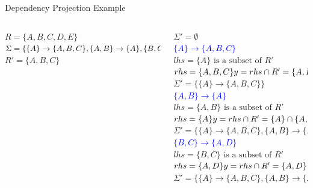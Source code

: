 \documentclass[UTF8]{beamer}
\begin{document}
\begin{frame}[fragile]{Dependency Projection Example}
\scriptsize
\begin{columns}
    \begin{column}{0.3\textwidth}
        $R = \{A,B,C,D,E\}$\\
\vspace{0.2cm}
$\Sigma =\\ \{ \{ A \} \to \{ A, B, C \},\\ \{ A, B \} \to \{ A \},\\ \{ B, C \} \to \{ A, D \},\\ \{ B \} \to \{ A, B \},\\ \{ C \} \to \{ D \} \}$\\
\vspace{0.2cm}
$R' = \{A,B,C\}$
    \end{column}
    \begin{column}{0.7\textwidth}
    \pause
    \tiny
    $\Sigma' = \emptyset$\\
    \vspace{0.1cm}
    \pause
        \textcolor{blue}{$\{A\}\to \{A,B,C\}$}\\
        $lhs = \{A\} \text{ is a subset of } R'$\\
        $rhs = \{A,B,C\}\\
        y = rhs \cap R' = \{A,B,C\}\cap\{A,B,C\} = \{A,B,C\} \neq \emptyset$\\
        $\Sigma' = \{\{A\}\to \{A,B,C\}\}$\\
        \vspace{0.1cm}
    \pause
    \textcolor{blue}{$\{A,B\} \to \{A\}$}\\
    $lhs = \{A,B\} \text{ is a subset of } R'$\\
    $rhs = \{A\}\\
    y = rhs \cap R' = \{A\}\cap\{A,B,C\} = \{A\} \neq \emptyset$\\
    $\Sigma' = \{\{A\}\to \{A,B,C\}, \{A,B\} \to \{A\}\}$\\
    \vspace{0.1cm}
    \pause
    \textcolor{blue}{$\{B,C\} \to \{A,D\}$}\\
    $lhs = \{B,C\} \text{ is a subset of } R'$\\
    $rhs = \{A,D\}\\
    y = rhs \cap R' = \{A,D\}\cap\{A,B,C\} = \{A\} \neq \emptyset$\\
    $\Sigma' = \{\{A\}\to \{A,B,C\}, \{A,B\} \to \{A\}, \{B,C\} \to \{A\}\}$\\

\end{column}
\end{columns}
\end{frame}
\end{document}
